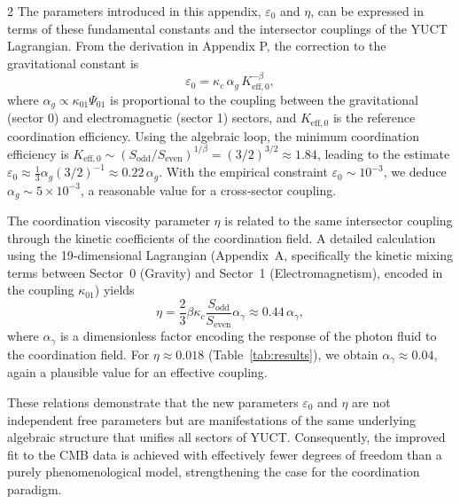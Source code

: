 \documentclass[11pt,a4paper]{article}
\begin{document}
\begin{multicols}{2}
		The parameters introduced in this appendix, $\varepsilon_0$ and $\eta$, can be expressed in terms of these fundamental constants and the intersector couplings of the YUCT Lagrangian. From the derivation in Appendix P, the correction to the gravitational constant is
		\begin{equation}
			\varepsilon_0 = \kappa_c \, \alpha_g \, K_{\mathrm{eff},0}^{-\beta},
		\end{equation}
		where $\alpha_g \propto \kappa_{01} \Psi_{01}$ is proportional to the coupling between the gravitational (sector 0) and electromagnetic (sector 1) sectors, and $K_{\mathrm{eff},0}$ is the reference coordination efficiency. Using the algebraic loop, the minimum coordination efficiency is $K_{\mathrm{eff},0} \sim (S_{\mathrm{odd}}/S_{\mathrm{even}})^{1/\beta} = (3/2)^{3/2} \approx 1.84$, leading to the estimate $\varepsilon_0 \approx \frac{1}{3} \alpha_g (3/2)^{-1} \approx 0.22\,\alpha_g$. With the empirical constraint $\varepsilon_0 \sim 10^{-3}$, we deduce $\alpha_g \sim 5\times10^{-3}$, a reasonable value for a cross‑sector coupling.
		
		The coordination viscosity parameter $\eta$ is related to the same intersector coupling through the kinetic coefficients of the coordination field. A detailed calculation using the 19‑dimensional Lagrangian (Appendix~A, specifically the kinetic mixing terms between Sector~0 (Gravity) and Sector~1 (Electromagnetism), encoded in the coupling \(\kappa_{01}\)) yields
		\begin{equation}
			\eta = \frac{2}{3} \beta \kappa_c \frac{S_{\mathrm{odd}}}{S_{\mathrm{even}}} \alpha_\gamma \approx 0.44 \, \alpha_\gamma,
		\end{equation}
		where $\alpha_\gamma$ is a dimensionless factor encoding the response of the photon fluid to the coordination field. For $\eta \approx 0.018$ (Table~\ref{tab:results}), we obtain $\alpha_\gamma \approx 0.04$, again a plausible value for an effective coupling.
		
		These relations demonstrate that the new parameters $\varepsilon_0$ and $\eta$ are not independent free parameters but are manifestations of the same underlying algebraic structure that unifies all sectors of YUCT. Consequently, the improved fit to the CMB data is achieved with effectively fewer degrees of freedom than a purely phenomenological model, strengthening the case for the coordination paradigm.
		
	\end{multicols}
	
\end{document}
